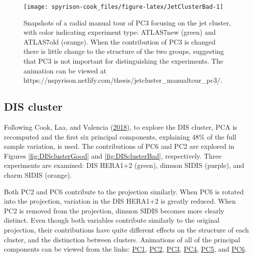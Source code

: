 \begin{Schunk}
\begin{figure}

{\centering \texttt{[image: spyrison-cook\_files/figure-latex/JetClusterBad-1]} 

}

\caption[Snapshots of a radial manual tour of PC3 focusing on the jet cluster, with color indicating experiment type]{Snapshots of a radial manual tour of PC3 focusing on the jet cluster, with color indicating experiment type: ATLAS7new (green) and ATLAS7old (orange).  When the contribution of PC3 is changed there is little change to the structure of the two groups, suggesting that PC3 is not important for distinguishing the experiments. The animation can be viewed at https://nspyrison.netlify.com/thesis/jetcluster\_manualtour\_pc3/.}\label{fig:JetClusterBad}
\end{figure}
\end{Schunk}

\hypertarget{dis-cluster}{%
\subsection{DIS cluster}\label{dis-cluster}}

Following Cook, Laa, and Valencia
(\protect\hyperlink{ref-cook_dynamical_2018}{2018}), to explore the DIS
cluster, PCA is recomputed and the first six principal components,
explaining 48\% of the full sample variation, is used. The contributions
of PC6 and PC2 are explored in Figures \ref{fig:DISclusterGood} and
\ref{fig:DISclusterBad}, respectively. Three experiments are examined:
DIS HERA1+2 (green), dimuon SIDIS (purple), and charm SIDIS (orange).

Both PC2 and PC6 contribute to the projection similarly. When PC6 is
rotated into the projection, variation in the DIS HERA1+2 is greatly
reduced. When PC2 is removed from the projection, dimuon SIDIS becomes
more clearly distinct. Even though both variables contribute similarly
to the original projection, their contributions have quite different
effects on the structure of each cluster, and the distinction between
clusters. Animations of all of the principal components can be viewed
from the links:
\href{https://nspyrison.netlify.com/thesis/discluster_manualtour_pc1/}{PC1},
\href{https://nspyrison.netlify.com/thesis/discluster_manualtour_pc2/}{PC2},
\href{https://nspyrison.netlify.com/thesis/discluster_manualtour_pc3/}{PC3},
\href{https://nspyrison.netlify.com/thesis/discluster_manualtour_pc4/}{PC4},
\href{https://nspyrison.netlify.com/thesis/discluster_manualtour_pc5/}{PC5},
and
\href{https://nspyrison.netlify.com/thesis/discluster_manualtour_pc6/}{PC6}.

